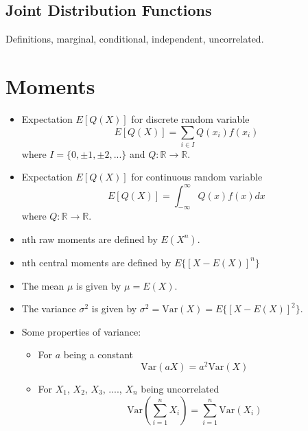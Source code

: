 \documentclass[11pt]{article}
\begin{document}
\subsection{Joint Distribution Functions}
Definitions, marginal, conditional, independent, uncorrelated.
\section{Moments}
\begin{itemize}
\item Expectation $E[Q(X)]$ for discrete random variable
\begin{equation}
E[Q(X)] = \sum_{i \in I} Q(x_i) f(x_i)
\end{equation}
where $I = \{0, \pm 1, \pm 2, ...\}$ and $Q:\mathbb{R} \to \mathbb{R}$.

\item Expectation $E[Q(X)]$ for continuous random variable
\begin{equation}
E[Q(X)] = \int_{-\infty}^{\infty} Q(x) f(x) dx
\end{equation}
where $Q:\mathbb{R} \to \mathbb{R}$.

\item nth raw moments are defined by $E(X^n)$.

\item nth central moments are defined by $E\{[X-E(X)]^n\}$

\item The mean $\mu$ is given by $\mu = E(X)$.

\item The variance $\sigma^2$ is given by $\sigma^2 = \text{Var}(X) = E \{[ X - E(X)]^2 \}$.

\item Some properties of variance:
\begin{itemize}
\item For $a$ being a constant
\begin{equation}
\text{Var}(aX) = a^2 \text{Var}(X)
\end{equation} 
\item For $X_1$, $X_2$, $X_3$, ...., $X_n$ being uncorrelated
\begin{equation}
\text{Var} \left ( \sum_{i=1}^n X_i \right ) = \sum_{i=1}^n \text{Var}(X_i)
\end{equation}
\end{itemize}

\end{itemize}
\end{document}
